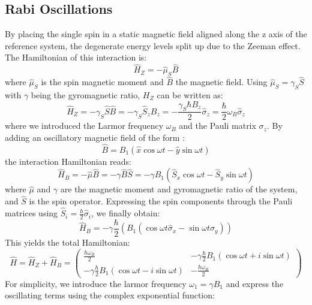 \documentclass[12pt,a4paper]{article}
\begin{document}
\subsection{Rabi Oscillations}\label{rabi}
By placing the single spin in a static magnetic field aligned along the z axis of the reference system, the degenerate energy levels split up due to the Zeeman effect. The Hamiltonian of this interaction is:
\begin{equation}
\hat{H}_Z=-\hat{\mu}_S\hat{B}
\end{equation}
where $\hat{\mu}_S$ is the spin magnetic moment and $\hat{B}$ the magnetic field. Using $\hat{\mu}_S=\gamma_S\hat{S}$ with $\gamma$ being the gyromagnetic ratio, $H_Z$ can be written as:
\begin{equation}\label{hz}
\hat{H}_Z=-\gamma_S\hat{S}\hat{B}=-\gamma_S\hat{S}_zB_z=-\frac{\gamma_S\hbar B_z}{2}\hat{\sigma}_z=\frac{\hbar}{2}\omega_B\hat{\sigma}_z
\end{equation}
where we introduced the Larmor frequency $\omega_{B}$ and the Pauli matrix $\sigma_z$. By adding an oscillatory magnetic field of the form \cite{bel}:
\begin{equation}
\hat{B}=B_1(\hat{x}\cos\omega t-\hat{y}\sin\omega t)
\end{equation}
the interaction Hamiltonian reads:
\begin{equation}
\hat{H}_B=-\hat{\mu}\hat{B}=-\gamma\hat{B}\hat{S}=-\gamma B_1(\hat{S}_x\cos\omega t-\hat{S}_y\sin\omega t)
\end{equation}
where $\hat{\mu}$ and $\gamma$ are the magnetic moment and gyromagnetic ratio of the system, and $\hat{S}$ is the spin operator. 
Expressing the spin components through the Pauli matrices using $\hat{S}_i=\frac{\hbar}{2}\hat{\sigma}_i$, we finally obtain:
\begin{equation}
\hat{H}_B=-\gamma\frac{\hbar}{2}\left(B_1(\cos\omega t\hat{\sigma}_x-\sin\omega t\hat{\sigma}_y)\right)
\end{equation}
This yields the total Hamiltonian:
\begin{equation}
\hat{H}=\hat{H}_Z+\hat{H}_B=\left(\begin{matrix}
\frac{\hbar\omega_{B}}{2}&-\gamma\frac{\hbar}{2}B_1(\cos\omega t+i\sin\omega t)\\
-\gamma\frac{\hbar}{2}B_1(\cos\omega t-i\sin\omega t)&-\frac{\hbar\omega_ {B}}{2}
\end{matrix}\right)
\end{equation}
For simplicity, we introduce the larmor frequency $\omega_1 =\gamma B_1$ and express the oscillating terms using the complex exponential function:
\end{document}
